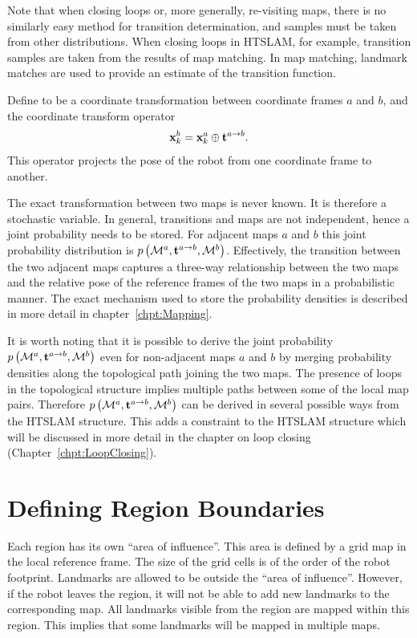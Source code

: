 Note that when closing loops or, more generally, re-visiting maps,
there is no similarly easy method for transition determination, and samples
must be taken from other distributions. When closing
loops in HTSLAM, for example, transition samples are taken from the results of map
matching. In map matching, landmark matches are used to provide an estimate of
the transition function.

Define  to be a coordinate transformation between
coordinate frames $a$ and $b$, and the coordinate transform operator
\transit\ 
\begin{equation}
\x{k}{}{b} = \x{k}{}{a} \transit \tr{}{a}{b}.
\end{equation}
This operator projects the pose of the robot from one coordinate frame to
another.

The exact transformation between two maps is never known. It is
therefore a stochastic variable. In general, transitions and maps are
not independent, hence a joint probability needs to be stored. For
adjacent maps $a$ and $b$ this joint probability distribution is
$\prob{\map{}{}{a},\tr{}{a}{b}, \map{}{}{b}}$. Effectively,
the transition between the two adjacent maps captures a three-way
relationship between the two maps and the relative pose of the
reference frames of the two maps in a probabilistic manner. The exact
mechanism used to store the probability densities is described in more
detail in chapter~\ref{chpt:Mapping}.

It is worth noting that it is possible to derive the joint
probability $\prob{\map{}{}{a},\tr{}{a}{b},\map{}{}{b}}$ even for
non-adjacent maps $a$ and $b$ by merging probability densities along
the topological path joining the two maps.  The presence of loops in
the topological structure implies multiple paths between some of the
local map pairs. Therefore $\prob{\map{}{}{a},\tr{}{a}{b},\map{}{}{b}}$ can
be derived in several possible ways from the HTSLAM structure. This
adds a constraint to the HTSLAM structure which will be discussed in
more detail in the chapter on loop
closing (Chapter~\ref{chpt:LoopClosing}).




\section{Defining Region Boundaries}
\label{sec:region}

Each region has its own ``area of influence''. This area is defined by
a grid map in the local reference frame. The size of the grid cells is
of the order of the robot footprint. Landmarks are allowed to be
outside the ``area of influence''. However, if the robot leaves the
region, it will not be able to add new landmarks to the corresponding
map. All landmarks visible from the region are mapped within
this region. This implies that some landmarks will be mapped in
multiple maps.

